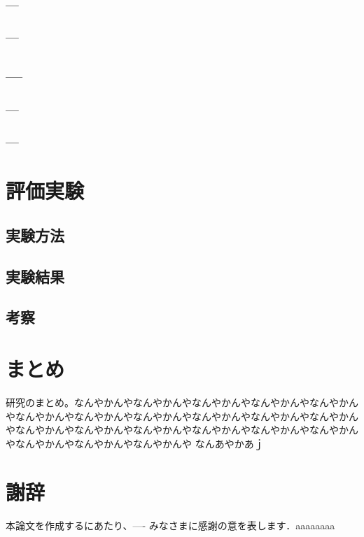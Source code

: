 \documentclass[11pt,a4j]{jreport}
\begin{document}
\subsection{---}
\subsection{---}
\section{---}
\subsection{---}
\subsection{---}

\chapter{評価実験}
\section{実験方法}
\section{実験結果}
\section{考察}

\chapter{まとめ}
研究のまとめ。なんやかんやなんやかんやなんやかんやなんやかんやなんやかんやなんやかんやなんやかんやなんやかんやなんやかんやなんやかんやなんやかんやなんやかんやなんやかんやなんやかんやなんやかんやなんやかんやなんやかんやなんやかんやなんやかんやなんやかんや
なんあやかあｊ
\chapter*{謝辞} %
本論文を作成するにあたり、---- みなさまに感謝の意を表します．aaaaaaaa


\renewcommand{\bibname}{参考文献} %
\end{document}
